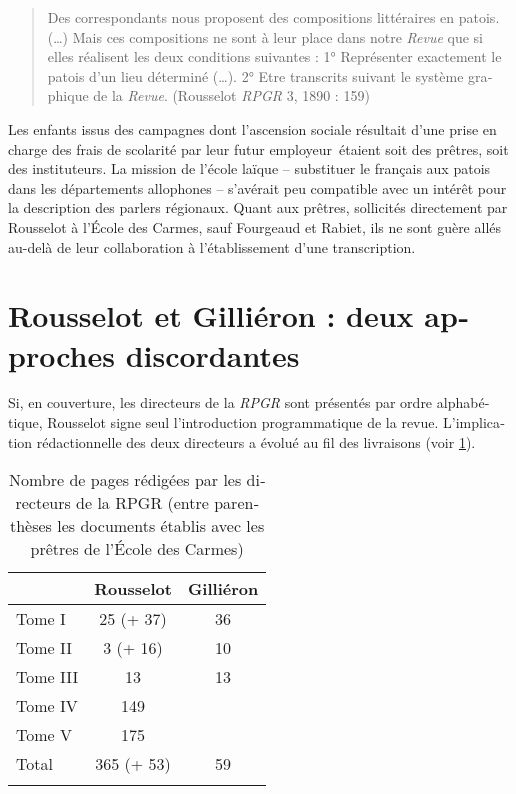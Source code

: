 \documentclass[output=paper]{../langscibook}
\begin{document}
\begin{otherlanguage}{french}
\begin{quote}
    Des correspondants nous proposent des compositions littéraires en patois. (…) Mais ces compositions ne sont à leur place dans notre \textit{Revue} que si elles réalisent les deux conditions suivantes : 1° Représenter exactement le patois d’un lieu déterminé (…). 2° Etre transcrits suivant le système graphique de la \textit{Revue}. (Rousselot \textit{RPGR} 3, 1890 : 159)
\end{quote}

Les enfants issus des campagnes dont l’ascension sociale résultait d’une prise en charge des frais de scolarité par leur futur employeur~étaient soit des prêtres, soit des instituteurs. La mission de l’école laïque – substituer le français aux patois dans les départements allophones – s’avérait peu compatible avec un intérêt pour la description des parlers régionaux. Quant aux prêtres, sollicités directement par Rousselot à l’École des Carmes, sauf Fourgeaud et Rabiet, ils ne sont guère allés au-delà de leur collaboration à l’établissement d’une transcription. 

\section{Rousselot et Gilliéron : deux approches discordantes}

Si, en couverture, les directeurs de la \textit{RPGR} sont présentés par ordre alphabétique, Rousselot signe seul l’introduction programmatique de la revue. L’implication rédactionnelle des deux directeurs a évolué au fil des livraisons (voir \ref{table: Tab.1}).

\begin{table}
\begin{tabular}{lcc}
\lsptoprule
          &    Rousselot    &    Gilliéron \\\midrule
Tome I   &   25  (+ 37)     &         36 \\
Tome II  &  3 (+ 16)           &    10 \\
Tome III  &  13       &         13 \\
Tome IV  &   149  & \\
Tome V  &  175      &    \\\midrule
Total   &   365 (+ 53)     &         59\\
\lspbottomrule 
\end{tabular}
\caption{Nombre de pages rédigées par les directeurs de la RPGR (entre parenthèses les documents établis avec les prêtres de l’École des Carmes)\label{table: Tab.1}}
\end{table}


\end{otherlanguage}
\end{document}
